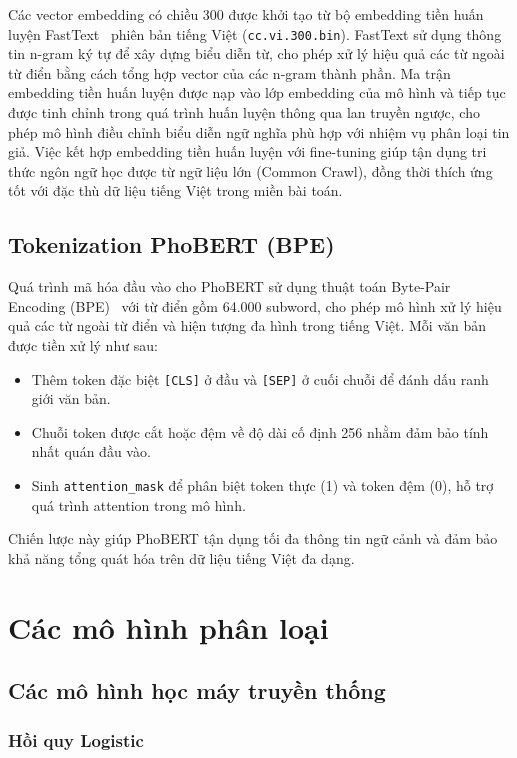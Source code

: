 \documentclass[12pt, a4paper]{report}
\newcommand{\bilstmEmbDim}{300}
\newcommand{\phobertMaxSeq}{256}        %
\begin{document}
Các vector embedding có chiều \bilstmEmbDim{} được khởi tạo từ bộ embedding tiền huấn luyện FastText~\cite{bojanowski2017fasttext} phiên bản tiếng Việt (\texttt{cc.vi.300.bin}). FastText sử dụng thông tin n-gram ký tự để xây dựng biểu diễn từ, cho phép xử lý hiệu quả các từ ngoài từ điển bằng cách tổng hợp vector của các n-gram thành phần. Ma trận embedding tiền huấn luyện được nạp vào lớp embedding của mô hình và tiếp tục được tinh chỉnh trong quá trình huấn luyện thông qua lan truyền ngược, cho phép mô hình điều chỉnh biểu diễn ngữ nghĩa phù hợp với nhiệm vụ phân loại tin giả. Việc kết hợp embedding tiền huấn luyện với fine-tuning giúp tận dụng tri thức ngôn ngữ học được từ ngữ liệu lớn (Common Crawl), đồng thời thích ứng tốt với đặc thù dữ liệu tiếng Việt trong miền bài toán.

\subsection{Tokenization PhoBERT (BPE)}

Quá trình mã hóa đầu vào cho PhoBERT sử dụng thuật toán Byte-Pair Encoding (BPE)~\cite{sennrich2016bpe} với từ điển gồm 64.000 subword, cho phép mô hình xử lý hiệu quả các từ ngoài từ điển và hiện tượng đa hình trong tiếng Việt. Mỗi văn bản được tiền xử lý như sau:
\begin{itemize}[leftmargin=2em]
  \item Thêm token đặc biệt \texttt{[CLS]} ở đầu và \texttt{[SEP]} ở cuối chuỗi để đánh dấu ranh giới văn bản.
  \item Chuỗi token được cắt hoặc đệm về độ dài cố định \phobertMaxSeq{} nhằm đảm bảo tính nhất quán đầu vào.
  \item Sinh \texttt{attention\_mask} để phân biệt token thực (1) và token đệm (0), hỗ trợ quá trình attention trong mô hình.
\end{itemize}
Chiến lược này giúp PhoBERT tận dụng tối đa thông tin ngữ cảnh và đảm bảo khả năng tổng quát hóa trên dữ liệu tiếng Việt đa dạng.

\section{Các mô hình phân loại}

\subsection{Các mô hình học máy truyền thống}

\subsubsection{Hồi quy Logistic}
\end{document}
